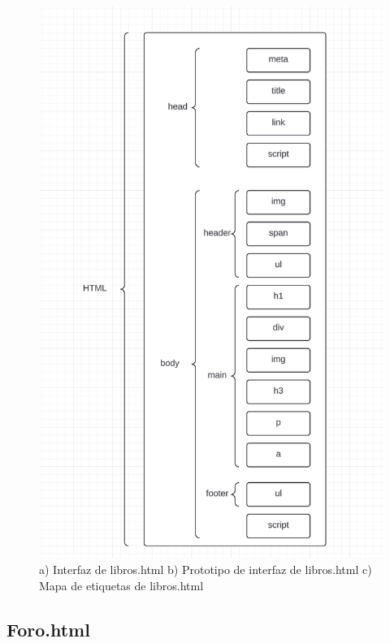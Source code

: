 \documentclass{article}
\begin{document}
\begin{figure}[H]
    \vspace{5mm}
    
    \includegraphics[width=\textwidth, height=0.4\textheight, keepaspectratio]{htmlFotos/MElibros.jpg}
    \caption{a) Interfaz de libros.html b) Prototipo de interfaz de libros.html c) Mapa de etiquetas de libros.html}
    \label{fig:imagenes_conjuntas}
\end{figure}

\subsection*{Foro.html}
\end{document}
